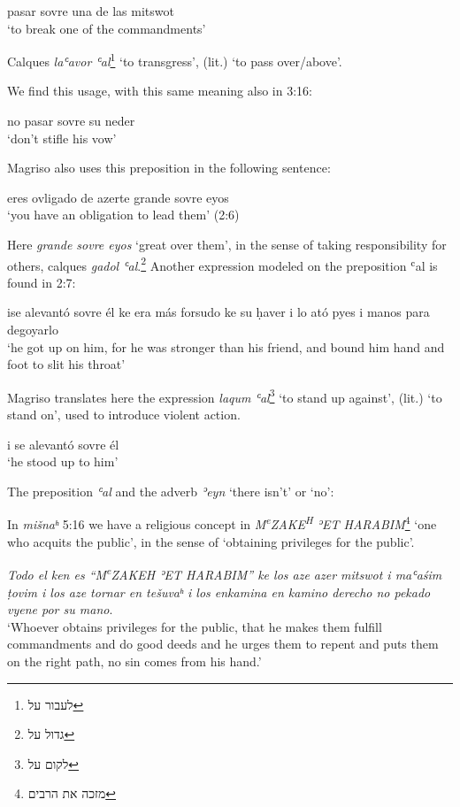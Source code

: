 \documentclass[output=paper,colorlinks,citecolor=brown,babel,arabicfont]{langscibook}
\begin{document}
\ea\label{ch3.7.ex.n31}
pasar sovre una de las mitswot \\
`to break one of the commandments'
\z

Calques \textit{laʿavor ʿal}\footnote{\texthebrew{לעבור על}} `to transgress', (lit.) `to pass over/above'.

We find this usage, with this same meaning also in 3:16: 

\ea\label{ch3.7.ex.n32}
no pasar sovre su neder \\
`don't stifle his vow'
\z

Magriso also uses this preposition in the following sentence: 

\ea\label{ch3.7.ex.n33}
eres ovligado de azerte grande sovre eyos \\
`you have an obligation to lead them' (2:6)
\z

Here \textit{grande sovre eyos} `great over them', in the sense of taking responsibility for others, calques  \textit{gadol ʿal}.\footnote{\texthebrew{גדול על}}  
Another expression modeled on the preposition ʿal is found in 2:7: 

\ea\label{ch3.7.ex.n34}
ise alevantó sovre él ke era más forsudo ke su ḥaver i lo ató pyes i manos para degoyarlo \\
`he got up on him, for he was stronger than his friend, and bound him hand and foot to slit his throat'
\z


Magriso translates here the  expression \textit{laqum ʿal}\footnote{\texthebrew{לקום על}} `to stand up against', (lit.) `to stand on', used to introduce violent action. 

\ea\label{ch3.7.ex.n35}
i se alevantó sovre él \\
`he stood up to him'
\z

\begin{description}

\item[The preposition \textit{ʿal} and the adverb \textit{ʾeyn} `there isn't' or `no':]
\end{description}

In \textit{mišnaʰ} 5:16 we have a religious concept in  \textit{M\textsuperscript{e}ZAKE\textsuperscript{H} ʾET HARABIM}\footnote{\texthebrew{מזכה את הרבים}} `one who acquits the public', in the sense of `obtaining privileges for the public'.

\ea\label{ch3.7.ex.n36}
\textit{Todo el ken es ``M\textsuperscript{e}ZAKEH ʾET HARABIM'' ke los aze azer mitswot i maʿaśim ṭovim i los aze tornar en tešuvaʰ i los enkamina en kamino derecho no pekado vyene por su mano}. \\
`Whoever obtains privileges for the public, that he makes them fulfill commandments and do good deeds and he urges them to repent and puts them on the right path, no sin comes from his hand.'
\z
\end{document}

